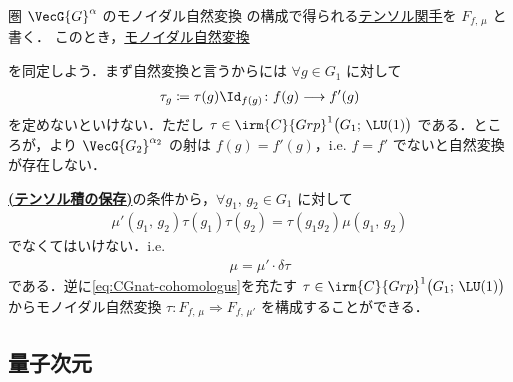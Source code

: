 \documentclass[TQFT_main]{subfiles}
\begin{document}
\begin{myexample}[label=def:CG-monoidalnat]{圏 $\VecG{G}^\alpha$ のモノイダル自然変換}
    の構成で得られる\hyperref[def:tensor-functor]{テンソル関手}を $F_{f,\, \mu}$ と書く．
    このとき，\hyperref[def:monoidal-nat]{モノイダル自然変換} 
    \begin{center}
    \end{center}
    を同定しよう．まず自然変換と言うからには $\forall g \in G_1$ に対して
    \begin{align}
        \tau_g \coloneqq \tau(g) \Id_{f(g)} \colon f(g) \lto f'(g)
    \end{align}
    を定めないといけない．ただし $\tau \in \irm{C}{Grp}^1\bigl(G_1;\, \LU(1)\bigr)$ である．ところが，より $\VecG{G_2}^{\alpha_2}$ の射は $f(g) = f'(g)$，i.e. $f = f'$ でないと自然変換が存在しない．

    \hyperref[def:monoidal-nat]{\textsf{\textbf{(テンソル積の保存)}}}の条件から，$\forall g_1,\, g_2 \in G_1$ に対して
    \begin{align}
        \mu'(g_1,\, g_2) \tau(g_1) \tau(g_2) = \tau(g_1g_2)\mu(g_1,\, g_2)
    \end{align}
    でなくてはいけない．i.e.
    \begin{align}
        \label{eq:CGnat-cohomologus}
        \mu = \mu' \cdot \delta \tau
    \end{align}
    である．逆に\eqref{eq:CGnat-cohomologus}を充たす $\tau \in \irm{C}{Grp}^1 \bigl( G_1;\, \LU(1) \bigr)$ からモノイダル自然変換 $\tau \colon F_{f,\, \mu} \Longrightarrow F_{f,\, \mu'}$ を構成することができる．
\end{myexample}


\subsection{量子次元}
\end{document}
